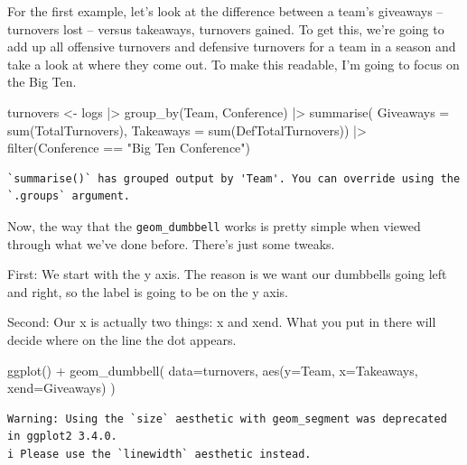 \documentclass[
  letterpaper,
  DIV=11,
  numbers=noendperiod]{scrreprt}
\newenvironment{Shaded}{\begin{snugshade}}{\end{snugshade}}
\newcommand{\AttributeTok}[1]{\textcolor[rgb]{0.40,0.45,0.13}{#1}}
\newcommand{\FunctionTok}[1]{\textcolor[rgb]{0.28,0.35,0.67}{#1}}
\newcommand{\NormalTok}[1]{\textcolor[rgb]{0.00,0.23,0.31}{#1}}
\newcommand{\OtherTok}[1]{\textcolor[rgb]{0.00,0.23,0.31}{#1}}
\newcommand{\SpecialCharTok}[1]{\textcolor[rgb]{0.37,0.37,0.37}{#1}}
\newcommand{\StringTok}[1]{\textcolor[rgb]{0.13,0.47,0.30}{#1}}
\begin{document}
For the first example, let's look at the difference between a team's
giveaways -- turnovers lost -- versus takeaways, turnovers gained. To
get this, we're going to add up all offensive turnovers and defensive
turnovers for a team in a season and take a look at where they come out.
To make this readable, I'm going to focus on the Big Ten.

\begin{Shaded}
\begin{Highlighting}[]
\NormalTok{turnovers }\OtherTok{\textless{}{-}}\NormalTok{ logs }\SpecialCharTok{|\textgreater{}}
  \FunctionTok{group\_by}\NormalTok{(Team, Conference) }\SpecialCharTok{|\textgreater{}} 
  \FunctionTok{summarise}\NormalTok{(}
    \AttributeTok{Giveaways =} \FunctionTok{sum}\NormalTok{(TotalTurnovers), }
    \AttributeTok{Takeaways =} \FunctionTok{sum}\NormalTok{(DefTotalTurnovers)) }\SpecialCharTok{|\textgreater{}}
  \FunctionTok{filter}\NormalTok{(Conference }\SpecialCharTok{==} \StringTok{"Big Ten Conference"}\NormalTok{)}
\end{Highlighting}
\end{Shaded}

\begin{verbatim}
`summarise()` has grouped output by 'Team'. You can override using the
`.groups` argument.
\end{verbatim}

Now, the way that the \texttt{geom\_dumbbell} works is pretty simple
when viewed through what we've done before. There's just some tweaks.

First: We start with the y axis. The reason is we want our dumbbells
going left and right, so the label is going to be on the y axis.

Second: Our x is actually two things: x and xend. What you put in there
will decide where on the line the dot appears.

\begin{Shaded}
\begin{Highlighting}[]
\FunctionTok{ggplot}\NormalTok{() }\SpecialCharTok{+} 
  \FunctionTok{geom\_dumbbell}\NormalTok{(}
    \AttributeTok{data=}\NormalTok{turnovers, }
    \FunctionTok{aes}\NormalTok{(}\AttributeTok{y=}\NormalTok{Team, }\AttributeTok{x=}\NormalTok{Takeaways, }\AttributeTok{xend=}\NormalTok{Giveaways)}
\NormalTok{  )}
\end{Highlighting}
\end{Shaded}

\begin{verbatim}
Warning: Using the `size` aesthetic with geom_segment was deprecated in ggplot2 3.4.0.
i Please use the `linewidth` aesthetic instead.
\end{verbatim}
\end{document}
